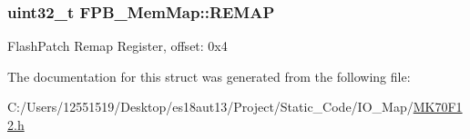 \subsubsection[{R\+E\+M\+A\+P}]{\setlength{\rightskip}{0pt plus 5cm}uint32\+\_\+t F\+P\+B\+\_\+\+Mem\+Map\+::\+R\+E\+M\+A\+P}\label{struct_f_p_b___mem_map_acdaa312f2de037db4f203b9cfd303772}
Flash\+Patch Remap Register, offset\+: 0x4 

The documentation for this struct was generated from the following file\+:\begin{DoxyCompactItemize}
\item 
C\+:/\+Users/12551519/\+Desktop/es18aut13/\+Project/\+Static\+\_\+\+Code/\+I\+O\+\_\+\+Map/\hyperlink{_m_k70_f12_8h}{M\+K70\+F12.\+h}\end{DoxyCompactItemize}
